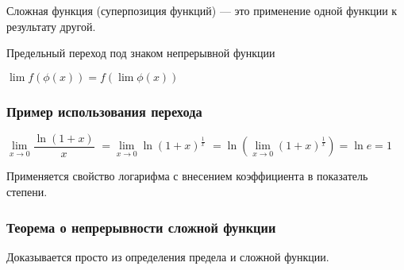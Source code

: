 Сложная функция (суперпозиция функций) — это применение одной функции к результату другой.

Предельный переход под знаком непрерывной функции

$ \lim f( \phi(x) ) = f( \lim  \phi(x) ) $

\subsubsection{Пример использования перехода}

$ \lim\limits_{x \to 0} \dfrac{ \ln(1+x) }{x} $
$ = \lim\limits_{x \to 0}  \ln(1+x)^{\frac{1}{x}} $
$ = \ln (\lim\limits_{x \to 0}  (1+x)^{\frac{1}{x}}) = \ln e = 1 $

Применяется свойство логарифма с внесением коэффициента в показатель степени.

\subsubsection{Теорема о непрерывности сложной функции}

Доказывается просто из определения предела и сложной функции.